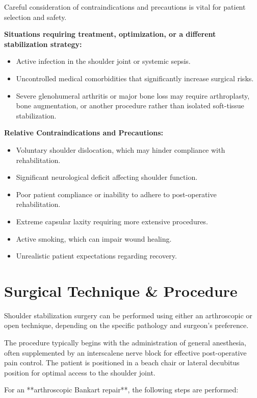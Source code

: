 Careful consideration of contraindications and precautions is vital for patient selection and safety.

\textbf{Situations requiring treatment, optimization, or a different stabilization strategy:}
\begin{itemize}
  \item Active infection in the shoulder joint or systemic sepsis.
  \item Uncontrolled medical comorbidities that significantly increase surgical risks.
  \item Severe glenohumeral arthritis or major bone loss may require arthroplasty, bone augmentation, or another procedure rather than isolated soft-tissue stabilization.
\end{itemize}

\textbf{Relative Contraindications and Precautions:}
\begin{itemize}
  \item Voluntary shoulder dislocation, which may hinder compliance with rehabilitation.
  \item Significant neurological deficit affecting shoulder function.
  \item Poor patient compliance or inability to adhere to post-operative rehabilitation.
  \item Extreme capsular laxity requiring more extensive procedures.
  \item Active smoking, which can impair wound healing.
  \item Unrealistic patient expectations regarding recovery.
\end{itemize}

\section*{Surgical Technique \& Procedure}
Shoulder stabilization surgery can be performed using either an arthroscopic or open technique, depending on the specific pathology and surgeon's preference. 

The procedure typically begins with the administration of general anesthesia, often supplemented by an interscalene nerve block for effective post-operative pain control. The patient is positioned in a beach chair or lateral decubitus position for optimal access to the shoulder joint.

For an **arthroscopic Bankart repair**, the following steps are performed:

